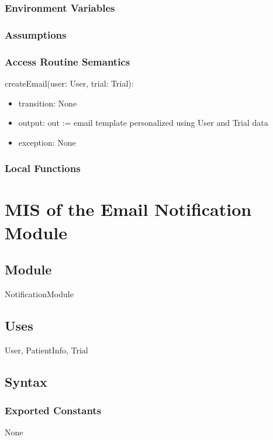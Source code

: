 \documentclass[12pt, titlepage]{article}
\begin{document}
\subsubsection{Environment Variables}

\subsubsection{Assumptions}

\subsubsection{Access Routine Semantics}

\noindent createEmail(user: User, trial: Trial):
\begin{itemize}
\item transition: None
\item output: out := email template personalized using User and Trial data
\item exception: None
\end{itemize}

\subsubsection{Local Functions}

\section{MIS of the Email Notification Module} \label{EmailNotification}

\subsection{Module}

NotificationModule

\subsection{Uses}
User, PatientInfo, Trial

\subsection{Syntax}

\subsubsection{Exported Constants}
None
\end{document}
